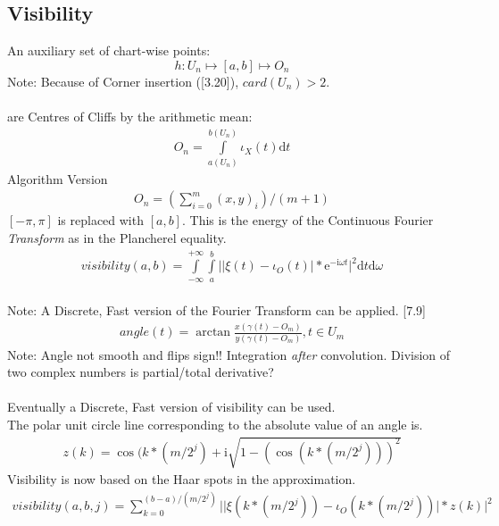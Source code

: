 \documentclass{report}
\begin{document}
\subsection{Visibility}
An auxiliary set of chart-wise points:
\begin{equation}
h: U_{n} \mapsto [a,b] \mapsto O_{n}
\end{equation}
Note: Because of Corner insertion (\cite{Analyzer}[3.20]), $card(U_{n}) > 2$.\\\\
are Centres of Cliffs by the arithmetic mean:
\begin{align}
O_{n}=\int \limits _{a(U_{n})}^{b(U_{n})} \iota_{X}(t)\mathrm{d}t
\end{align}
Algorithm Version
\begin{align}
O_{n}=(\sum \limits _{i=0}^{m} (x,y)_{i})/(m+1)
\end{align}
$[-\pi,\pi]$ is replaced with $[a,b]$. This is the energy of the Continuous Fourier \emph{Transform} as in the Plancherel equality.
\begin{align}
visibility(a,b)= \int \limits _{-\infty}^{+\infty}\int \limits _{a}^{b}\lvert \vert \xi(t)-\iota_{O}(t)\vert * \mathrm{e}^{-\mathrm{i}\omega t} \rvert^2 \mathrm{d}t \mathrm{d}\omega
\end{align}\\
Note: A Discrete, Fast version of the Fourier Transform can be applied. \cite{Formelsammlung}[7.9]
\begin{align}
angle(t)=\arctan\frac{x(\gamma(t)-O_{m})}{y(\gamma(t)-O_{m})},t \in U_{m}
\end{align}
Note: Angle not smooth and flips sign!! Integration \emph{after} convolution. Division of two complex numbers is partial/total derivative?\\\\
Eventually a Discrete, Fast version of visibility can be used.\\
The polar unit circle line corresponding to the absolute value of an angle is.
\begin{align}
z(k) = \cos(k*(m/2^j) + \mathrm{i}\sqrt{1-(\cos(k*(m/2^j)))^2}
\end{align}
Visibility is now based on the Haar spots in the approximation.
\begin{align}
visibility(a,b,j)= \sum _{k=0}^{(b-a)/(m/2^j)}\lvert \vert \xi(k*(m/2^j))-\iota_{O}(k*(m/2^j))\vert * z(k) \rvert^2
\end{align}
\end{document}
